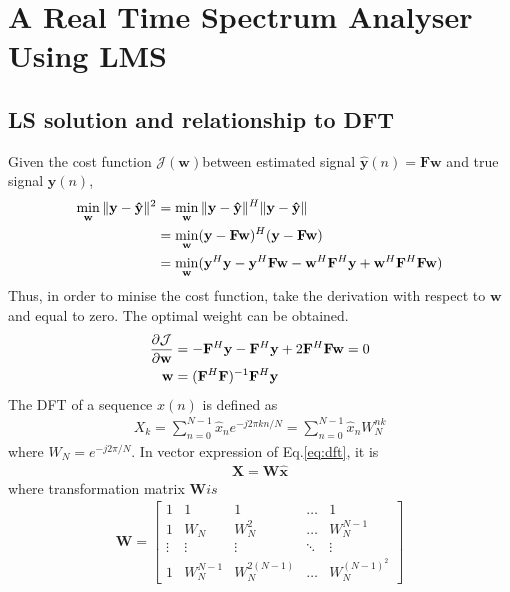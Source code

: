 \section{A Real Time Spectrum Analyser Using LMS}
\subsection{LS solution and relationship to DFT}
Given the cost function $\mathcal{J}(\mathbf w)$between estimated signal $\mathbf {\hat y}(n)=\mathbf{F}\mathbf{w}$ and true signal $\mathbf y(n)$,
\begin{align}
\min_{\mathbf{w}}\|\mathbf{y}-\mathbf {\hat y}\|^2
&=\min_{\mathbf{w}}\|\mathbf{y}-\mathbf {\hat y}\|^H \|\mathbf{y}-\mathbf {\hat y}\|\notag\\
&=\min_{\mathbf{w}}(\mathbf{y}-\mathbf{F}\mathbf{w})^H (\mathbf{y}-\mathbf{F}\mathbf{w}) \notag\\
&=\min_{\mathbf{w}}(\mathbf{y}^H\mathbf{y}-\mathbf{y}^H\mathbf{F}\mathbf{w}-\mathbf{w}^H\mathbf{F}^H\mathbf{y}+\mathbf{w}^H\mathbf{F}^H\mathbf{F}\mathbf{w})
\label{eq:cost}
\end{align}
Thus, in order to minise the cost function, take the derivation with respect to $\mathbf w$ and equal to zero. The optimal weight can be obtained.
\begin{align}
\frac{\partial \mathcal{J}}{\partial \mathbf{w}} 
&=-\mathbf{F}^H\mathbf{y}-\mathbf{F}^H\mathbf{y}+2\mathbf{F}^H\mathbf{F}\mathbf{w}=0\notag\\
\mathbf{w}&=(\mathbf{F}^H\mathbf{F})^{-1}\mathbf{F}^H\mathbf{y}
\label{eq:ls}
\end{align}
The DFT of a sequence $x(n)$ is defined as
\begin{align}
X_k =\sum_{n=0}^{N-1}\hat x_n e^{-j2\pi kn/N}=\sum_{n=0}^{N-1}\hat x_n W^{nk}_N
\label{eq:dft}
\end{align}
where $W_N=e^{-j2\pi/N}$. In vector expression of Eq.\ref{eq:dft}, it is 
\begin{align}
\mathbf{X=W\hat x}
\end{align}
where transformation matrix $\mathbf{W} is$
\begin{align}
\mathbf{W}=
\begin{bmatrix}
    1 & 1 & 1 & \dots  & 1 \\
    1 & W_N & W_N^2 & \dots  & W_N^{N-1} \\
    \vdots & \vdots & \vdots & \ddots & \vdots \\
    1 & W_N^{N-1} & W_N^{2(N-1)} & \dots  & W_N^{(N-1)^2}
\end{bmatrix}
\end{align}
